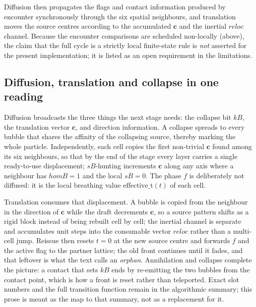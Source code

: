 Diffusion then propagates the flags and contact information produced by
encounter synchronously through the six spatial neighbours, and translation
moves the source centres according to the accumulated $\mathbf{c}$ and the
inertial $reloc$ channel.  Because the encounter comparisons are scheduled
non-locally (above), the claim that the full cycle is a strictly local
finite-state rule is \emph{not} asserted for the present implementation; it
is listed as an open requirement in the limitations.

\subsection{Diffusion, translation and collapse in one reading}
\label{subsec:diffusion-demo}

Diffusion broadcasts the three things the next stage needs: the collapse bit
$kB$, the translation vector $\mathbf{c}$, and direction information.  A
collapse spreads to every bubble that shares the affinity of the collapsing
source, thereby marking the whole particle.  Independently, each cell copies
the first non-trivial $\mathbf{c}$ found among its six neighbours, so that by
the end of the stage every layer carries a single ready-to-use displacement;
$sB$-hunting increments $\mathbf{c}$ along any axis where a neighbour has
$homB=1$ and the local $sB=0$.  The phase $f$ is deliberately not diffused: it
is the local breathing value $\mathrm{effective\_t}(t)$ of each cell.

Translation consumes that displacement.  A bubble is copied from the
neighbour in the direction of $\mathbf{c}$ while the draft decrements
$\mathbf{c}$, so a source pattern shifts as a rigid block instead of being
rebuilt cell by cell; the inertial channel is separate and accumulates unit
steps into the consumable vector $reloc$ rather than a multi-cell jump.
Reissue then resets $t=0$ at the new source centre and forwards $f$ and the
active flag to the partner lattice; the old front continues until it fades,
and that leftover is what the text calls an \emph{orphan}.  Annihilation and
collapse complete the picture: a contact that sets $kB$ ends by re-emitting
the two bubbles from the contact point, which is how a front is reset rather
than teleported.  Exact slot numbers and the full transition function remain
in the algorithmic summary; this prose is meant as the map to that summary,
not as a replacement for it.


